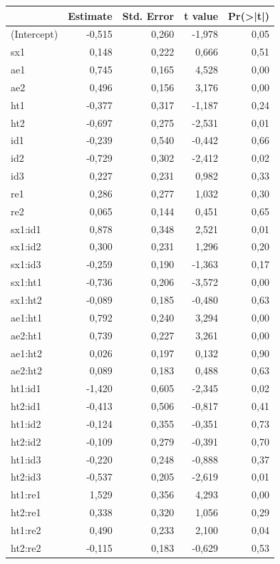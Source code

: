 \documentclass[]{book}
\theoremstyle{definition}
\theoremstyle{definition}
\theoremstyle{definition}
\theoremstyle{remark}
\begin{document}
\begin{tabular}{lrrrr}
\toprule
  & Estimate & Std. Error & t value & Pr(>|t|)\\
\midrule
(Intercept) & -0,515 & 0,260 & -1,978 & 0,05\\
sx1 & 0,148 & 0,222 & 0,666 & 0,51\\
ae1 & 0,745 & 0,165 & 4,528 & 0,00\\
ae2 & 0,496 & 0,156 & 3,176 & 0,00\\
ht1 & -0,377 & 0,317 & -1,187 & 0,24\\
\addlinespace
ht2 & -0,697 & 0,275 & -2,531 & 0,01\\
id1 & -0,239 & 0,540 & -0,442 & 0,66\\
id2 & -0,729 & 0,302 & -2,412 & 0,02\\
id3 & 0,227 & 0,231 & 0,982 & 0,33\\
re1 & 0,286 & 0,277 & 1,032 & 0,30\\
\addlinespace
re2 & 0,065 & 0,144 & 0,451 & 0,65\\
sx1:id1 & 0,878 & 0,348 & 2,521 & 0,01\\
sx1:id2 & 0,300 & 0,231 & 1,296 & 0,20\\
sx1:id3 & -0,259 & 0,190 & -1,363 & 0,17\\
sx1:ht1 & -0,736 & 0,206 & -3,572 & 0,00\\
\addlinespace
sx1:ht2 & -0,089 & 0,185 & -0,480 & 0,63\\
ae1:ht1 & 0,792 & 0,240 & 3,294 & 0,00\\
ae2:ht1 & 0,739 & 0,227 & 3,261 & 0,00\\
ae1:ht2 & 0,026 & 0,197 & 0,132 & 0,90\\
ae2:ht2 & 0,089 & 0,183 & 0,488 & 0,63\\
\addlinespace
ht1:id1 & -1,420 & 0,605 & -2,345 & 0,02\\
ht2:id1 & -0,413 & 0,506 & -0,817 & 0,41\\
ht1:id2 & -0,124 & 0,355 & -0,351 & 0,73\\
ht2:id2 & -0,109 & 0,279 & -0,391 & 0,70\\
ht1:id3 & -0,220 & 0,248 & -0,888 & 0,37\\
\addlinespace
ht2:id3 & -0,537 & 0,205 & -2,619 & 0,01\\
ht1:re1 & 1,529 & 0,356 & 4,293 & 0,00\\
ht2:re1 & 0,338 & 0,320 & 1,056 & 0,29\\
ht1:re2 & 0,490 & 0,233 & 2,100 & 0,04\\
ht2:re2 & -0,115 & 0,183 & -0,629 & 0,53\\
\bottomrule
\end{tabular}
\end{document}
